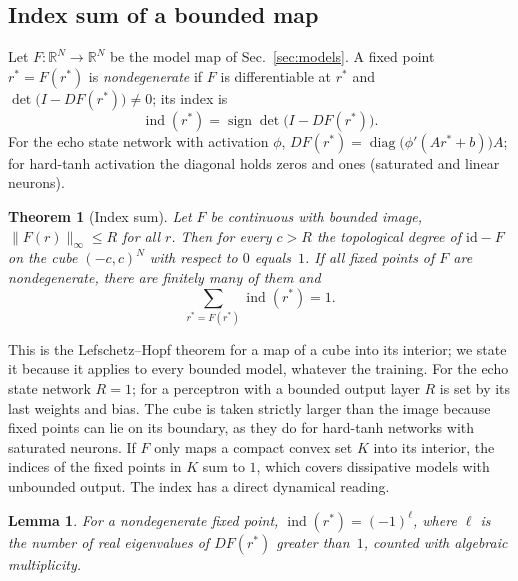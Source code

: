 \documentclass[aip,cha,reprint,amsmath,amssymb,longbibliography]{revtex4-2}
\newtheorem{theorem}{Theorem}
\newtheorem{lemma}{Lemma}
\theoremstyle{definition}
\newcommand{\ind}{\operatorname{ind}}
\begin{document}
\subsection{Index sum of a bounded map}
\label{sec:degree}

Let $F:\mathbb{R}^N\to\mathbb{R}^N$ be the model map of Sec.~\ref{sec:models}. A fixed point $r^*=F(r^*)$ is
\emph{nondegenerate} if $F$ is differentiable at $r^*$ and $\det\bigl(I-DF(r^*)\bigr)\neq0$; its index is
\begin{equation}
\ind(r^*)=\operatorname{sign}\det\bigl(I-DF(r^*)\bigr).
\label{eq:index}
\end{equation}
For the echo state network with activation $\phi$, $DF(r^*)=\operatorname{diag}\bigl(\phi'(Ar^*+b)\bigr)A$; for hard-tanh activation the diagonal
holds zeros and ones (saturated and linear neurons).

\begin{theorem}[Index sum]
\label{thm:degree}
Let $F$ be continuous with bounded image, $\|F(r)\|_\infty\le R$ for all $r$. Then for every $c>R$ the topological
degree of $\mathrm{id}-F$ on the cube $(-c,c)^N$ with respect to $0$ equals~$1$. If all fixed points of $F$ are
nondegenerate, there are finitely many of them and
\begin{equation}
\sum_{r^*=F(r^*)}\ind(r^*)=1.
\label{eq:indexsum}
\end{equation}
\end{theorem}

This is the Lefschetz--Hopf theorem for a map of a cube into its interior;\cite{GranasDugundji2003Fixed,Deimling1985NFA}
we state it because it applies to every bounded model, whatever the training. For the echo state network $R=1$; for a
perceptron with a bounded output layer $R$ is set by its last weights and bias. The cube is taken strictly larger than the
image because fixed points can lie on its boundary, as they do for hard-tanh networks with saturated neurons. If $F$ only
maps a compact convex set $K$ into its interior, the indices of the fixed points in $K$ sum to $1$, which covers
dissipative models with unbounded output. The index has a direct dynamical reading.\cite{KatokHasselblatt1995Intro}

\begin{lemma}
\label{lem:parity}
For a nondegenerate fixed point, $\ind(r^*)=(-1)^\ell$, where $\ell$ is the number of real eigenvalues of $DF(r^*)$ greater
than~$1$, counted with algebraic multiplicity.
\end{lemma}
\end{document}
